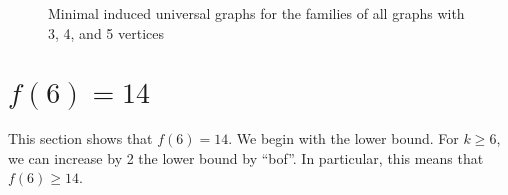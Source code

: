 \documentclass[12pt]{article}
\begin{document}
\begin{figure}[htb]
\caption{Minimal induced universal graphs for the families of all
graphs with 3, 4, and 5 vertices}
\label{fig:graphs}
\end{figure}

\section{\texorpdfstring{$f(6) = 14$}{f(6)=14}}\label{sec:f6}

This section shows that $f(6) = 14$.  We begin with the lower bound.
For $k \geq 6$, we can increase by 2 the lower bound by ``bof''.  In particular,
this means that $f(6) \geq 14$.
\end{document}

